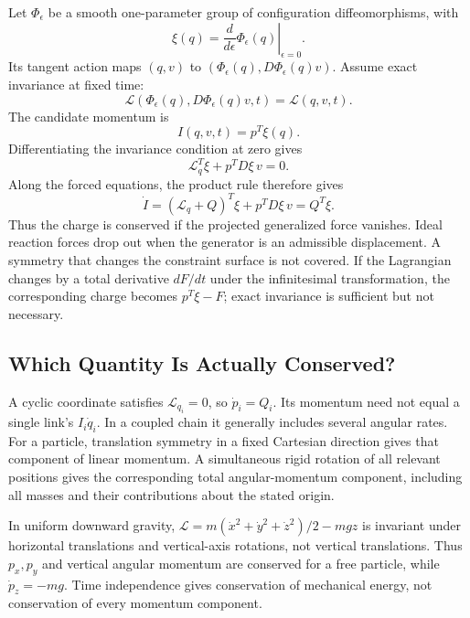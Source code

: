 Let $\Phi_\epsilon$ be a smooth one-parameter group of configuration diffeomorphisms, with
\begin{equation}
\xi(q)=\left.\frac{d}{d\epsilon}\Phi_\epsilon(q)\right|_{\epsilon=0}.
\label{eq:noether_generator}
\end{equation}
Its tangent action maps $(q,v)$ to $(\Phi_\epsilon(q),D\Phi_\epsilon(q)v)$. Assume exact invariance at fixed time:
\begin{equation}
\mathcal L(\Phi_\epsilon(q),D\Phi_\epsilon(q)v,t)=\mathcal L(q,v,t).
\label{eq:noether_symmetry}
\end{equation}
The candidate momentum is
\begin{equation}
I(q,v,t)=p^T\xi(q).
\label{eq:noether_charge}
\end{equation}
Differentiating the invariance condition at zero gives
\begin{equation}
\mathcal L_q^T\xi+p^TD\xi\,v=0.
\label{eq:noether_diff}
\end{equation}
Along the forced equations, the product rule therefore gives
\begin{equation}
\dot I=(\mathcal L_q+Q)^T\xi+p^TD\xi\,v=Q^T\xi.
\label{eq:noether_dIdt}
\end{equation}
Thus the charge is conserved if the projected generalized force vanishes. Ideal reaction forces drop out when the generator is an admissible displacement. A symmetry that changes the constraint surface is not covered. If the Lagrangian changes by a total derivative $dF/dt$ under the infinitesimal transformation, the corresponding charge becomes $p^T\xi-F$; exact invariance is sufficient but not necessary.

\subsection{Which Quantity Is Actually Conserved?}
\label{subsec:lagrangian_symmetry_examples}
\label{laymans:noether_practice}

A cyclic coordinate satisfies $\mathcal L_{q_i}=0$, so $\dot p_i=Q_i$. Its momentum need not equal a single link's $I_i\dot q_i$. In a coupled chain it generally includes several angular rates. For a particle, translation symmetry in a fixed Cartesian direction gives that component of linear momentum. A simultaneous rigid rotation of all relevant positions gives the corresponding total angular-momentum component, including all masses and their contributions about the stated origin.

In uniform downward gravity, $\mathcal L=m(\dot x^2+\dot y^2+\dot z^2)/2-mgz$ is invariant under horizontal translations and vertical-axis rotations, not vertical translations. Thus $p_x,p_y$ and vertical angular momentum are conserved for a free particle, while $\dot p_z=-mg$. Time independence gives conservation of mechanical energy, not conservation of every momentum component.

